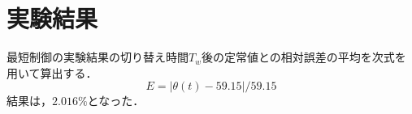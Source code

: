 \documentclass[12pt]{jsarticle}
\begin{document}
\section{実験結果}
最短制御の実験結果の切り替え時間$T_w$後の定常値との相対誤差の平均を次式を用いて算出する．
\begin{equation}
E = |\theta(t) - 59.15 | / 59.15
\end{equation}
結果は，$2.016\%$となった．
\end{document}
